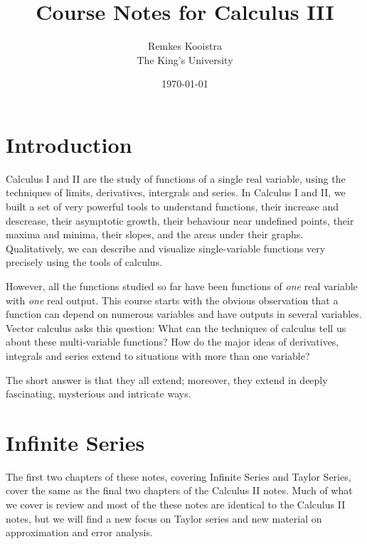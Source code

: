 \documentclass[fleqn,letterpaper]{report}
\begin{document}
\title{Course Notes for Calculus III}
\author{Remkes Kooistra \\ 
	The King's University}
\date{\today}

\maketitle

\setcounter{tocdepth}{1}
\tableofcontents

\chapter{Introduction}
\label{introduction}

Calculus I and II are the study of functions of a single real
variable, using the techniques of limits, derivatives,
intergrals and series. In Calculus I and II, we built a set of
very powerful tools to understand functions, their increase
and descrease, their asymptotic growth, their behaviour near
undefined points, their maxima and minima, their slopes, and
the areas under their graphs. Qualitatively, we can describe
and visualize single-variable functions very precisely using
the tools of calculus.

However, all the functions studied so far have been functions
of \emph{one} real variable with \emph{one} real output. This
course starts with the obvious observation that a function can
depend on numerous variables and have outputs in several
variables. Vector calculus asks this question: What can the
techniques of calculus tell us about these multi-variable
functions? How do the major ideas of derivatives, integrals
and series extend to situations with more than one variable?

The short answer is that they all extend; moreover, they
extend in deeply fascinating, mysterious and intricate ways. 

\chapter{Infinite Series}
\label{infinite-series}

The first two chapters of these notes, covering Infinite
Series and Taylor Series, cover the same as the final
two chapters of the Calculus II notes. Much of what we cover
is review and most of the these notes are identical to the Calculus II
notes, but we will find a new focus on Taylor series and
new material on approximation and error analysis. 
\end{document}
